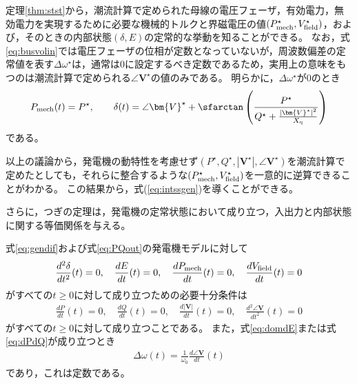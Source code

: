 \documentclass[tombow,dvipdfmx]{corona-a5-1.1}
\begin{document}
定理\ref{thm:stst}から，潮流計算で定められた母線の電圧フェーザ，有効電力，無効電力を実現するために必要な機械的トルクと界磁電圧の値$(P_{\rm mech}^{\star},V_{\rm field}^{\star})$，および，そのときの内部状態$(\delta,E)$の定常的な挙動を知ることができる。
なお，式\ref{eq:busvolin}では電圧フェーザの位相が定数となっていないが，周波数偏差の定常値を表す$\Delta \omega^{\star}$は，通常は0に設定するべき定数であるため，実用上の意味をもつのは潮流計算で定められる$\angle \bm{V}^{\star}$の値のみである。
明らかに，$\Delta \omega^{\star}$が0のとき
\begin{align*}
P_{{\rm mech}}(t) =    P^{\star},\qquad
\delta (t)  = \angle \bm{V}^{\star}
+ \sfarctan \left( \frac{P^{\star}}{Q^{\star} + \tfrac{ |\bm{V}^{\star}|^2}{X_{\rm q}} } \right)
\end{align*}
である。

以上の議論から，発電機の動特性を考慮せず$(P^{\star},Q^{\star},|\bm{V}^{\star}|,\angle \bm{V}^{\star})$を潮流計算で定めたとしても，それらに整合するような$(P_{\rm mech}^{\star},V_{\rm field}^{\star})$を一意的に逆算できることがわかる。
この結果から，式(\ref{eq:intssgen})を導くことができる。

さらに，つぎの定理は，発電機の定常状態において成り立つ，入出力と内部状態に関する等価関係を与える。

\begin{定理}[発電機の入出力と内部状態に関する等価関係]
\label{thm:outst}
式\ref{eq:gendif}および式\ref{eq:PQout}の発電機モデルに対して
\begin{align}\label{eq:domdE}
\frac{d^2 \delta}{dt^2}(t)=0
,\quad
\frac{dE}{dt}(t)=0
,\quad
\frac{d P_{\rm mech}}{dt}(t)=0
,\quad
\frac{d V_{\rm field}}{dt}(t)=0
\end{align}
がすべての$t\geq0$に対して成り立つための必要十分条件は
\begin{align}\label{eq:dPdQ}
\frac{dP}{dt}(t)=0
,\quad
\frac{dQ}{dt}(t)=0
,\quad
\frac{d|\bm{V}|}{dt}(t)=0
,\quad
\frac{d^2 \angle \bm{V}}{dt^2}(t)=0
\end{align}
がすべての$t\geq0$に対して成り立つことである。
また，式\ref{eq:domdE}または式\ref{eq:dPdQ}が成り立つとき
\begin{align}\label{eq:frer}
\Delta \omega(t)= \frac{1}{\omega_0}\frac{d \angle \bm{V}}{dt}(t)
\end{align}
であり，これは定数である。
\end{定理}
\end{document}
